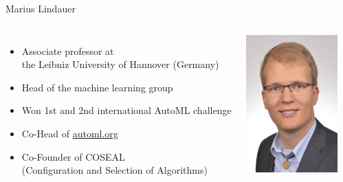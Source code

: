 \begin{frame}[c]{Marius Lindauer}



\begin{columns}
	
	
	\begin{itemize}
		\item Associate professor at\\ the Leibniz University of Hannover (Germany)
		\item Head of the machine learning group
		\item Won 1st and 2nd international AutoML challenge
		\item Co-Head of \url{automl.org}
		\item Co-Founder of COSEAL\\ (Configuration and Selection of Algorithms)
	\end{itemize}
	
	
	\includegraphics[width=1.0\textwidth]{images/lindauer.jpg}
	
\end{columns}


\end{frame}


